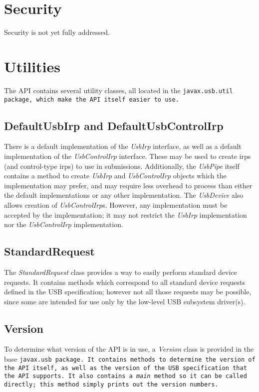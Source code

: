 \documentclass{article}
\newcommand{\myclass}[1]{\emph{#1}}
\newcommand{\myinterface}[1]{\emph{#1}}
\newcommand{\mypackage}[1]{\tt#1\rm}
\newcommand{\mymethod}[1]{\emph{#1}}
\newcommand{\mysectionend}[0]{\vfill\pagebreak[1]}
\begin{document}
\mysectionend


%

\section{Security}

Security is not yet fully addressed.

\mysectionend

%

\section{Utilities}

The API contains several utility classes, all located in the \mypackage{javax.usb.util}
package, which make the API itself easier to use.

\subsection{DefaultUsbIrp and DefaultUsbControlIrp}

There is a default implementation of the \myinterface{UsbIrp} interface, as well as a default
implementation of the \myinterface{UsbControlIrp} interface.  These may be used to create irps
(and control-type irps) to use in submissions.  Additionally, the \myinterface{UsbPipe} itself
contains a method to create \myinterface{UsbIrp} and \myinterface{UsbControlIrp} objects which
the implementation may prefer, and may require less overhead to process than either the default
implementations or any other implementation.  The \myinterface{UsbDevice} also allows creation of
\myinterface{UsbControlIrp}s.  However, any implementation must be accepted by the implementation;
it may not restrict the \myinterface{UsbIrp} implementation nor the \myinterface{UsbControlIrp}
implementation.

\subsection{StandardRequest}

The \myclass{StandardRequest} class provides a way to easily perform standard device requests.
It contains methods which correspond to all standard device requests defined in the USB
specification; however not all those requests may be possible, since some are intended for
use only by the low-level USB subsystem driver(s).

\subsection{Version}

To determine what version of the API is in use, a \myclass{Version} class is
provided in the base \mypackage{javax.usb} package.  It contains methods to determine
the version of the API itself, as well as the version of the USB specification
that the API supports.  It also contains a \mymethod{main} method so it can
be called directly; this method simply prints out the version numbers.

\mysectionend
\end{document}
